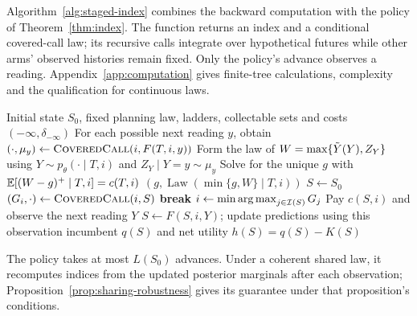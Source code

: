 Algorithm~\ref{alg:staged-index} combines the backward computation with the
policy of Theorem~\ref{thm:index}. The function returns an index and a conditional
covered-call law; its recursive calls integrate over hypothetical futures while
other arms' observed histories remain fixed. Only the policy's advance observes
a reading. Appendix~\ref{app:computation} gives finite-tree calculations,
complexity and the qualification for continuous laws.

\begin{algorithm}[htbp]
\caption{Staged index computation and search}
\label{alg:staged-index}
\small
\begin{algorithmic}[1]
\Require Initial state $S_0$, fixed planning law, ladders, collectable sets and costs
    \State \Return $(-\infty,\delta_{-\infty})$ 
  \EndIf
  \State For each possible next reading $y$, obtain
  \Statex \hspace{\algorithmicindent} $(\cdot,\mu_y)\gets\Call{CoveredCall}{i,F(T,i,y)}$
  \State Form the law of $W=\max\{\tilde Y(Y),Z_Y\}$ using
  \Statex \hspace{\algorithmicindent} $Y\sim p_\theta(\cdot\mid T,i)$ and $Z_Y\mid Y=y\sim\mu_y$
  \State Solve for the unique $g$ with $\mathbb{E}[(W-g)^+\mid T,i]=c(T,i)$
  \State \Return $(g,\operatorname{Law}(\min\{g,W\}\mid T,i))$
\EndFunction
{}
  \State $S\gets S_0$
      \State $(G_i,\cdot)\gets\Call{CoveredCall}{i,S}$
    \EndFor
      \State \textbf{break}
    \EndIf
    \State $i\gets\min\operatorname*{arg\,max}_{j\in\mathcal{I}(S)}G_j$
    \State Pay $c(S,i)$ and observe the next reading $Y$
    \State $S\gets F(S,i,Y)$; update predictions using this observation
  \EndWhile
  \State \Return incumbent $q(S)$ and net utility $h(S)=q(S)-K(S)$
\EndProcedure
\end{algorithmic}
\end{algorithm}

The policy takes at most $L(S_0)$ advances. Under a coherent shared law, it
recomputes indices from the updated posterior marginals after each observation;
Proposition~\ref{prop:sharing-robustness} gives its guarantee under that
proposition's conditions.
